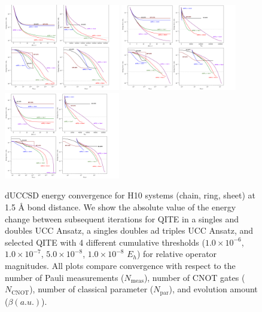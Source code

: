 \documentclass[aip,jcp,amsmath,amssymb, reprint]{revtex4-1}
\begin{document}
\begin{figure}[h!]
\centering
\includegraphics[width=0.45\textwidth]{sqite_paper/Chain 1.5 A.png}
\includegraphics[width=0.45\textwidth]{sqite_paper/Ring 1.5 A.png}
\includegraphics[width=0.45\textwidth]{sqite_paper/Sheet 1.5 A.png}
\caption{dUCCSD energy convergence for H10 systems (chain, ring, sheet) at 1.5 Å bond distance. We show the absolute value of the energy change between subsequent iterations for QITE in a singles and doubles UCC Ansatz, a singles doubles ad triples UCC Ansatz, and selected QITE with 4 different cumulative thresholds ($1.0 \times 10^{-6}$, $1.0 \times 10^{-7}$, $5.0 \times 10^{-8}$, $1.0 \times 10^{-8}$ $E_h$) for relative operator magnitudes. All plots compare convergence with respect to the number of Pauli measurements ($N_\mathrm{meas}$), number of CNOT gates ($N_\mathrm{CNOT}$), number of classical parameter ($N_\mathrm{par}$), and evolution amount ($\beta (a. u.)$).}
\label{fig:ene_plot_1.5A}
\end{figure}
\end{document}
